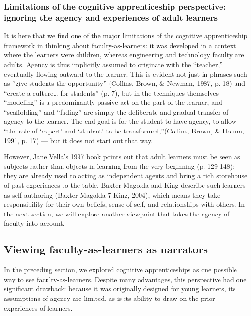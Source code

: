 \subsubsection{Limitations of the cognitive apprenticeship perspective: ignoring the agency and experiences of adult learners}

It is here that we find one of the major limitations of the cognitive apprenticeship framework in thinking about faculty-as-learners: it was developed in a context where the learners were children, whereas engineering and technology faculty are adults. Agency is thus implicitly assumed to originate with the “teacher,” eventually flowing outward to the learner. This is evident not just in phrases such as “give students the opportunity” (Collins, Brown, & Newman, 1987, p. 18) and “create a culture… for students” (p. 7), but in the techniques themselves — “modeling” is a predominantly passive act on the part of the learner, and “scaffolding” and “fading” are simply the deliberate and gradual transfer of agency to the learner. The end goal is for the student to have agency, to allow “the role of ‘expert’ and ‘student’ to be transformed,”(Collins, Brown, & Holum, 1991, p. 17) — but it does not start out that way. 

However, Jane Vella’s 1997 book points out that adult learners must be seen as subjects rather than objects in learning from the very beginning (p. 129-148); they are already used to acting as independent agents and bring a rich storehouse of past experiences to the table. Baxter-Magolda and King describe such learners as self-authoring (Baxter-Magolda 7 King, 2004), which means they take responsibility for their own beliefs, sense of self, and relationships with others. In the next section, we will explore another viewpoint that takes the agency of faculty into account.

\subsection{Viewing faculty-as-learners as narrators}

In the preceding section, we explored cognitive apprenticeships as one possible way to see faculty-as-learners. Despite many advantages, this perspective had one significant drawback: because it was originally designed for young learners, its assumptions of agency are limited, as is its ability to draw on the prior experiences of learners.

